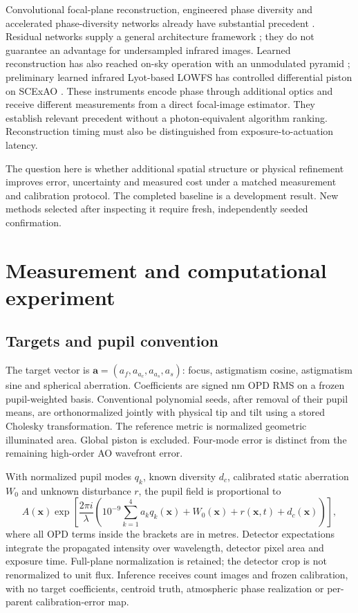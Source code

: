 \documentclass[11pt,a4paper]{article}
\begin{document}
Convolutional focal-plane reconstruction, engineered phase diversity and
accelerated phase-diversity networks already have substantial precedent
\cite{orban,quesnel,wu}. Residual networks supply a general architecture
framework \cite{he}; they do not guarantee an advantage for undersampled
infrared images. Learned reconstruction has also reached on-sky operation
with an unmodulated pyramid \cite{landman}; preliminary learned infrared
Lyot-based LOWFS has controlled differential piston on SCExAO \cite{singh}.
These instruments encode phase through additional optics and receive different
measurements from a direct focal-image estimator. They establish relevant
precedent without a photon-equivalent algorithm ranking. Reconstruction timing
must also be distinguished from exposure-to-actuation latency.

The question here is whether additional spatial structure or
physical refinement improves error, uncertainty and measured cost under a
matched measurement and calibration protocol. The completed baseline is a
development result. New methods selected after inspecting it require fresh,
independently seeded confirmation.

\section{Measurement and computational experiment}
\subsection{Targets and pupil convention}
The target vector is
$\boldsymbol a=(a_f,a_{a_c},a_{a_s},a_s)$: focus, astigmatism cosine,
astigmatism sine and spherical aberration. Coefficients are signed nm OPD RMS
on a frozen pupil-weighted basis. Conventional polynomial seeds, after removal
of their pupil means, are orthonormalized jointly with physical tip and tilt
using a stored Cholesky transformation. The reference metric is normalized
geometric illuminated area. Global piston is excluded. Four-mode error is
distinct from the remaining high-order AO wavefront error.

With normalized pupil modes $q_k$, known diversity $d_c$, calibrated static
aberration $W_0$ and unknown disturbance $r$, the pupil field is proportional to
\begin{equation}
 A(\boldsymbol x)\exp\!\left[\frac{2\pi i}{\lambda}
 \left(10^{-9}\sum_{k=1}^4 a_kq_k(\boldsymbol x)
             +W_0(\boldsymbol x)+r(\boldsymbol x,t)+d_c(\boldsymbol x)\right)\right],
\end{equation}
where all OPD terms inside the brackets are in metres. Detector expectations
integrate the propagated intensity over wavelength, detector pixel area and
exposure time. Full-plane normalization is retained; the detector crop is not
renormalized to unit flux. Inference receives count images and frozen
calibration, with no target coefficients, centroid truth, atmospheric phase
realization or per-parent calibration-error map.
\end{document}
